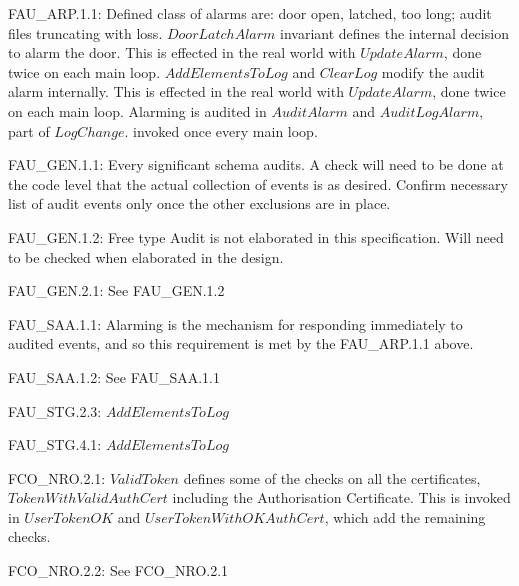 {\footnotesize \sf 
FAU\_ARP.1.1:
} 
\newline
	Defined class of alarms are: door
	open, latched, too long; audit files truncating with loss. 
\newline
	$DoorLatchAlarm$ invariant defines the internal decision to
	alarm the door. This is effected in the real world with
	$UpdateAlarm$, done twice on each main loop. 
\newline
	$AddElementsToLog$ and $ClearLog$ modify the audit alarm
	internally.  This is effected in the real world with
	$UpdateAlarm$, done twice on each main loop. 
\newline
	Alarming is audited in $AuditAlarm$ and $AuditLogAlarm$, part of
	$LogChange$. invoked once every main loop. 

{\footnotesize \sf 
FAU\_GEN.1.1:
}
\newline
	Every significant schema audits. A check will need to be done
	at the code level that the actual collection of events is as
	desired. 
	Confirm necessary list of audit events only once the other
	exclusions are in place. 

{\footnotesize \sf 
FAU\_GEN.1.2:
}
\newline
	Free type Audit is not elaborated in this specification. Will
	need to be checked when elaborated in the design. 

{\footnotesize \sf 
FAU\_GEN.2.1:
}
\newline
	See FAU\_GEN.1.2

{\footnotesize \sf 
FAU\_SAA.1.1:
}
\newline
	Alarming is the mechanism for responding immediately to
	audited events, and so this requirement is met by the
	FAU\_ARP.1.1 above. 

{\footnotesize \sf 
FAU\_SAA.1.2:
}
\newline
	See FAU\_SAA.1.1

{\footnotesize \sf 
FAU\_STG.2.3:
}
\newline
	$AddElementsToLog$

{\footnotesize \sf 
FAU\_STG.4.1:
}
\newline
	$AddElementsToLog$

{\footnotesize \sf 
FCO\_NRO.2.1:
}
\newline
	$ValidToken$ defines some of the checks on all the
	certificates, $TokenWithValidAuthCert$ including the
	Authorisation Certificate. This is invoked in $UserTokenOK$
	and $UserTokenWithOKAuthCert$, which add the remaining
	checks. 

{\footnotesize \sf 
FCO\_NRO.2.2:
}
\newline
	See FCO\_NRO.2.1

